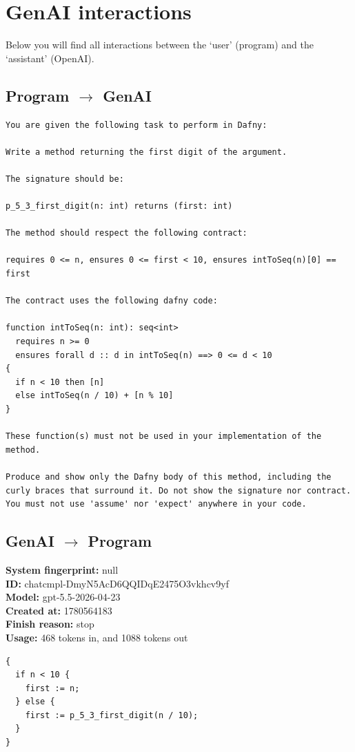 \documentclass{article}
\begin{document}
\section*{GenAI interactions}
Below you will find all interactions between the `user' (program) and the `assistant' (OpenAI).
\subsection*{Program $\rightarrow$ GenAI}
\begin{lstlisting}
You are given the following task to perform in Dafny:

Write a method returning the first digit of the argument.

The signature should be:

p_5_3_first_digit(n: int) returns (first: int)

The method should respect the following contract:

requires 0 <= n, ensures 0 <= first < 10, ensures intToSeq(n)[0] == first

The contract uses the following dafny code:

function intToSeq(n: int): seq<int>
  requires n >= 0
  ensures forall d :: d in intToSeq(n) ==> 0 <= d < 10
{
  if n < 10 then [n]
  else intToSeq(n / 10) + [n % 10]
}

These function(s) must not be used in your implementation of the method.

Produce and show only the Dafny body of this method, including the curly braces that surround it. Do not show the signature nor contract. You must not use 'assume' nor 'expect' anywhere in your code.
\end{lstlisting}
\subsection*{GenAI $\rightarrow$ Program}
\textbf{System fingerprint: }null
\\\textbf{ID: }chatcmpl-DmyN5AcD6QQIDqE2475O3vkhcv9yf
\\\textbf{Model: }gpt-5.5-2026-04-23
\\\textbf{Created at: }1780564183
\\\textbf{Finish reason: }stop
\\\textbf{Usage: }468 tokens in, and 1088 tokens out
\begin{lstlisting}
{
  if n < 10 {
    first := n;
  } else {
    first := p_5_3_first_digit(n / 10);
  }
}
\end{lstlisting}
\end{document}
